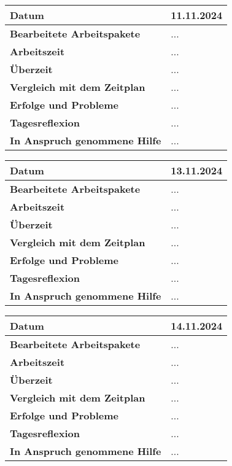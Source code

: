 \begin{longtable}{p{}|p{}}
	\hline
	\textbf{Datum}                       & 11.11.2024 \\
	\hline
	\textbf{Bearbeitete Arbeitspakete}   & ... \\
	\hline
	\textbf{Arbeitszeit}                 & ... \\
	\hline
	\textbf{Überzeit}                    & ... \\
	\hline
	\textbf{Vergleich mit dem Zeitplan}  & ... \\
	\hline
	\textbf{Erfolge und Probleme}        & ...
	\\
	\hline
	\textbf{Tagesreflexion}              & ...
	\\
	\hline
	\textbf{In Anspruch genommene Hilfe} & ... \\
	\hline
\end{longtable}\label{tab:arbeitsprotokoll-tag4}
\newpage

\begin{longtable}{p{}|p{}}
	\hline
	\textbf{Datum}                       & 13.11.2024 \\
	\hline
	\textbf{Bearbeitete Arbeitspakete}   & ... \\
	\hline
	\textbf{Arbeitszeit}                 & ... \\
	\hline
	\textbf{Überzeit}                    & ... \\
	\hline
	\textbf{Vergleich mit dem Zeitplan}  & ... \\
	\hline
	\textbf{Erfolge und Probleme}        & ...
	\\
	\hline
	\textbf{Tagesreflexion}              & ...
	\\
	\hline
	\textbf{In Anspruch genommene Hilfe} & ... \\
	\hline
\end{longtable}\label{tab:arbeitsprotokoll-tag3}
\newpage

\begin{longtable}{p{}|p{}}
	\hline
	\textbf{Datum}                       & 14.11.2024 \\
	\hline
	\textbf{Bearbeitete Arbeitspakete}   & ... \\
	\hline
	\textbf{Arbeitszeit}                 & ... \\
	\hline
	\textbf{Überzeit}                    & ... \\
	\hline
	\textbf{Vergleich mit dem Zeitplan}  & ... \\
	\hline
	\textbf{Erfolge und Probleme}        & ...
	\\
	\hline
	\textbf{Tagesreflexion}              & ...
	\\
	\hline
	\textbf{In Anspruch genommene Hilfe} & ... \\
	\hline
\end{longtable}\label{tab:arbeitsprotokoll-tag5}
\newpage

